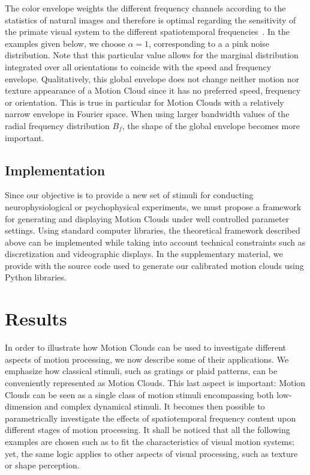 \documentclass[a4paper,11pt]{article}%
\begin{document}
The color envelope weights the different frequency channels according to the statistics of natural images and therefore is optimal regarding the sensitivity of the primate visual system to the different spatiotemporal frequencies~\citep{Atick92}. In the examples given below,  we choose $\alpha = 1$, corresponding to a  a pink noise distribution. Note that this particular value allows for the marginal distribution integrated over all orientations to coincide with the speed and frequency envelope. Qualitatively, this global envelope does not change neither motion nor texture appearance of a Motion Cloud since it has no preferred speed, frequency or orientation. This is true in particular for Motion Clouds with a relatively narrow envelope in Fourier space. When using larger bandwidth values of the radial frequency distribution $B_{f}$, the shape of the global envelope becomes more important. %

\subsection{Implementation} \label{subsection:implementation} %
Since our objective is to provide a new set of stimuli for conducting neurophysiological or psychophysical experiments, we must propose a framework for generating and displaying Motion Clouds under well controlled parameter settings. Using standard computer libraries,  the theoretical framework described above can be implemented while taking into account technical constraints such as discretization and videographic displays. In the supplementary material, we provide with the source code used to generate our calibrated motion clouds using Python libraries. %

\section{Results}\label{section:Results} %

In order to illustrate how Motion Clouds can be used to investigate different aspects of motion processing, we now describe some of their applications. We emphasize how classical stimuli, such as gratings or plaid patterns, can be conveniently represented as Motion Clouds. This last aspect is important: Motion Clouds can be seen as a single class of motion stimuli encompassing both low-dimension and complex dynamical stimuli. It becomes then possible to parametrically investigate the effects of spatiotemporal frequency content upon different stages of motion processing. It shall be noticed that all the following examples are chosen such as to fit the characteristics of visual motion systems; yet, the same logic applies to other aspects of visual processing, such as texture or shape perception. %
\end{document}
